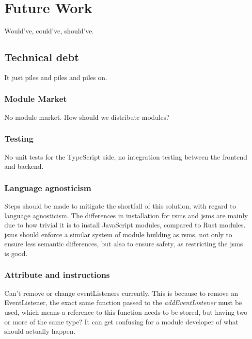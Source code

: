 \chapter{Future Work} \label{cha:future}

Would've, could've, should've.


\section{Technical debt}

It just piles and piles and piles on.

\subsection{Module Market}

No module market. How should we distribute modules?

\subsection{Testing}

No unit tests for the TypeScript side, no integration testing between the
frontend and backend.

\subsection{Language agnosticism}

Steps should be made to mitigate the shortfall of this solution, with regard to
language agnosticism. The differences in installation for \gls*{rsms} and
\gls*{jsms} are mainly due to how trivial it is to install JavaScript modules,
compared to Rust modules. \gls*{jsms} should enforce a similar system of module
building as \gls*{rsms}, not only to ensure less semantic differences, but also
to ensure safety, as restricting the \gls*{jsms} is good.

\subsection{Attribute and instructions}

Can't remove or change eventListeners currently. This is because to remove an
EventListener, the exact same function passed to the \textit{addEventListener}
must be used, which means a reference to this function needs to be stored, but
having two or more of the same type? It can get confusing for a module developer
of what should actually happen.

